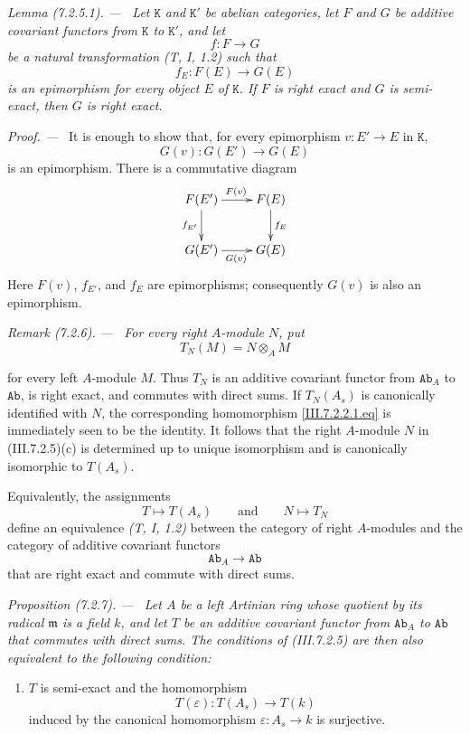 \documentclass[10pt,oneside]{book}
\newcommand{\cat}[1]{\mathtt{#1}}
\newcommand{\sref}[2][]{(#2)}
\newenvironment{proposition}[1][]{\par\medskip\noindent\itshape Proposition (#1). ---\ }{\par}
\newenvironment{lemma}[1][]{\par\medskip\noindent\itshape Lemma (#1). ---\ }{\par}
\newenvironment{remark}[1][]{\par\medskip\noindent\itshape Remark (#1). ---\ }{\par}
\newenvironment{proof}{\par\medskip\noindent\textit{Proof. ---\ }}{\par}
\begin{document}
\begin{lemma}[7.2.5.1]
\label{III.7.2.5.1}
Let $\cat{K}$ and $\cat{K}'$ be abelian categories, let $F$ and
$G$ be additive covariant functors from $\cat{K}$ to
$\cat{K}'$, and let
\[
  f:F\longrightarrow G
\]
be a natural transformation \emph{(T, I, 1.2)} such that
\[
  f_E:F(E)\longrightarrow G(E)
\]
is an epimorphism for every object $E$ of $\cat{K}$.  If $F$ is
right exact and $G$ is semi-exact, then $G$ is right exact.
\end{lemma}

\begin{proof}
It is enough to show that, for every epimorphism
$v:E'\to E$ in $\cat{K}$,
\[
  G(v):G(E')\longrightarrow G(E)
\]
is an epimorphism.  There is a commutative diagram
\[
\xymatrix{
  F(E')\ar[r]^{F(v)}\ar[d]_{f_{E'}}
  & F(E)\ar[d]^{f_E}
  \\
  G(E')\ar[r]_{G(v)}
  & G(E)
}
\]
Here $F(v)$, $f_{E'}$, and $f_E$ are epimorphisms; consequently
$G(v)$ is also an epimorphism.
\end{proof}

\begin{remark}[7.2.6]
\label{III.7.2.6}
For every right $A$-module $N$, put
\[
  T_N(M)=N\otimes_A M
\]
\par\medskip\noindent
for every left $A$-module $M$.  Thus $T_N$ is an additive
covariant functor from $\cat{Ab}_A$ to $\cat{Ab}$, is right
exact, and commutes with direct sums.  If $T_N(A_s)$ is
canonically identified with $N$, the corresponding homomorphism
\eqref{III.7.2.2.1.eq} is immediately seen to be the identity.
It follows that the right $A$-module $N$ in
\sref{III.7.2.5}(c) is determined up to unique isomorphism and
is canonically isomorphic to $T(A_s)$.

Equivalently, the assignments
\[
  T\longmapsto T(A_s)
  \qquad\text{and}\qquad
  N\longmapsto T_N
\]
define an equivalence \emph{(T, I, 1.2)} between the category
of right $A$-modules and the category of additive covariant
functors
\[
  \cat{Ab}_A\longrightarrow\cat{Ab}
\]
that are right exact and commute with direct sums.
\end{remark}

\begin{proposition}[7.2.7]
\label{III.7.2.7}
Let $A$ be a left Artinian ring whose quotient by its radical
$\mathfrak m$ is a field $k$, and let $T$ be an additive
covariant functor from $\cat{Ab}_A$ to $\cat{Ab}$ that commutes
with direct sums.  The conditions of \sref{III.7.2.5} are then
also equivalent to the following condition:
\begin{enumerate}
  \item[(d)] $T$ is semi-exact and the homomorphism
    \[
      T(\varepsilon):T(A_s)\longrightarrow T(k)
    \]
    induced by the canonical homomorphism
    $\varepsilon:A_s\to k$ is surjective.
\end{enumerate}
\end{proposition}
\end{document}
